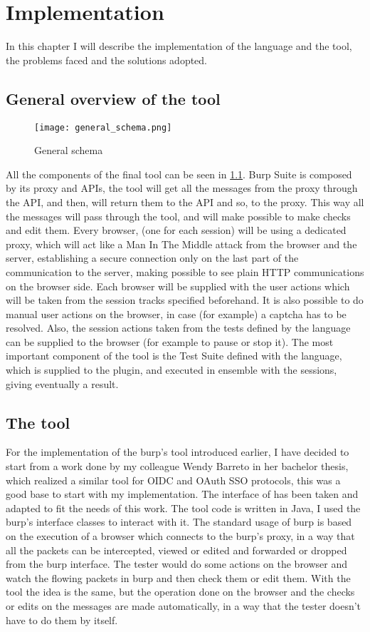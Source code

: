 \chapter{Implementation}
In this chapter I will describe the implementation of the language and the tool, the problems faced and the solutions adopted.

\section{General overview of the tool}
\begin{figure}
    \texttt{[image: general\_schema.png]}
    \caption{General schema}
    \label{fig:general_schema}
\end{figure}

All the components of the final tool can be seen in \ref{fig:general_schema}. Burp Suite is composed by its proxy and APIs, the tool will get all the messages from the proxy through the API, and then, will return them to the API and so, to the proxy. This way all the messages will pass through the tool, and will make possible to make checks and edit them.
Every browser, (one for each session) will be using a dedicated proxy, which will act like a Man In The Middle attack from the browser and the server, establishing a secure connection only on the last part of the communication to the server, making possible to see plain HTTP communications on the browser side. Each browser will be supplied with the user actions which will be taken from the session tracks specified beforehand. It is also possible to do manual user actions on the browser, in case (for example) a captcha has to be resolved. Also, the session actions taken from the tests defined by the language can be supplied to the browser (for example to pause or stop it). The most important component of the tool is the Test Suite defined with the language, which is supplied to the plugin, and executed in ensemble with the sessions, giving eventually a result.

\section{The tool}
For the implementation of the \Gls{burp}'s tool introduced earlier, I have decided to start from a work done by my colleague Wendy Barreto \cite{wendy_barreto} in her bachelor thesis, which realized a similar tool for \Gls{OIDC} and \Gls{OAuth} SSO protocols, this was a good base to start with my implementation. The interface of \cite{wendy_barreto} has been taken and adapted to fit the needs of this work. The tool code is written in Java, I used the \Gls{burp}'s interface classes to interact with it.
The standard usage of \Gls{burp} is based on the execution of a browser which connects to the \Gls{burp}'s proxy, in a way that all the packets can be intercepted, viewed or edited and forwarded or dropped from the \Gls{burp} interface. The tester would do some actions on the browser and watch the flowing packets in \Gls{burp} and then check them or edit them. With the tool the idea is the same, but the operation done on the browser and the checks or edits on the messages are made automatically, in a way that the tester doesn't have to do them by itself.

